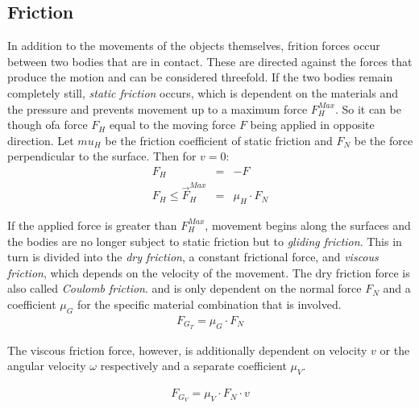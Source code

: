 \documentclass[10pt,a4paper]{article}
\begin{document}
\subsection{Friction}

In addition to the movements of the objects themselves, frition forces occur between two bodies that are in contact. These are directed against the forces that produce the motion and can be considered threefold.
If the two bodies remain completely still, \textit{static friction} occurs, which is dependent on the materials and the pressure and prevents movement up to a maximum force $F_H^{Max}$.
So it can be though ofa force $F_H$ equal to the moving force $F$ being applied in opposite direction.
Let $mu_H$ be the friction coefficient of static friction and $F_N$ be the force perpendicular to the
surface. Then for $v = 0$:
\begin{eqnarray}
    F_H & = & -F \\
    F_H \le \vec F_H^{Max} & = & \mu_H \cdot F_N
\end{eqnarray}

If the applied force is greater than $F_H^{Max}$, movement begins along the surfaces and the bodies
are no longer subject to static friction but to \textit{gliding friction}.
This in turn is divided into the \textit {dry friction}, a constant frictional force,
and \textit{viscous friction}, which depends on the velocity of the movement.
The dry friction force is also called \textit{Coulomb friction}.
and is only dependent on the normal force $F_N$ and a coefficient $\mu_G$ for the
specific material combination that is involved.
\begin{eqnarray}
    F_{G_T} = \mu_G \cdot F_N
\end{eqnarray}

The viscous friction force, however, is additionally dependent on velocity $v$ or the
angular velocity $\omega$ respectively and a separate coefficient $\mu_V$.

\begin{eqnarray}
    F_{G_V} = \mu_V \cdot F_N \cdot v
\end{eqnarray}
\end{document}

